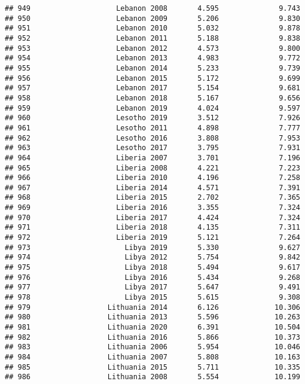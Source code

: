 \documentclass[
]{article}
\begin{document}
\begin{verbatim}
## 949                    Lebanon 2008       4.595              9.743
## 950                    Lebanon 2009       5.206              9.830
## 951                    Lebanon 2010       5.032              9.878
## 952                    Lebanon 2011       5.188              9.838
## 953                    Lebanon 2012       4.573              9.800
## 954                    Lebanon 2013       4.983              9.772
## 955                    Lebanon 2014       5.233              9.739
## 956                    Lebanon 2015       5.172              9.699
## 957                    Lebanon 2017       5.154              9.681
## 958                    Lebanon 2018       5.167              9.656
## 959                    Lebanon 2019       4.024              9.597
## 960                    Lesotho 2019       3.512              7.926
## 961                    Lesotho 2011       4.898              7.777
## 962                    Lesotho 2016       3.808              7.953
## 963                    Lesotho 2017       3.795              7.931
## 964                    Liberia 2007       3.701              7.196
## 965                    Liberia 2008       4.221              7.223
## 966                    Liberia 2010       4.196              7.258
## 967                    Liberia 2014       4.571              7.391
## 968                    Liberia 2015       2.702              7.365
## 969                    Liberia 2016       3.355              7.324
## 970                    Liberia 2017       4.424              7.324
## 971                    Liberia 2018       4.135              7.311
## 972                    Liberia 2019       5.121              7.264
## 973                      Libya 2019       5.330              9.627
## 974                      Libya 2012       5.754              9.842
## 975                      Libya 2018       5.494              9.617
## 976                      Libya 2016       5.434              9.268
## 977                      Libya 2017       5.647              9.491
## 978                      Libya 2015       5.615              9.308
## 979                  Lithuania 2014       6.126             10.306
## 980                  Lithuania 2013       5.596             10.263
## 981                  Lithuania 2020       6.391             10.504
## 982                  Lithuania 2016       5.866             10.373
## 983                  Lithuania 2006       5.954             10.046
## 984                  Lithuania 2007       5.808             10.163
## 985                  Lithuania 2015       5.711             10.335
## 986                  Lithuania 2008       5.554             10.199

\end{verbatim}
\end{document}
